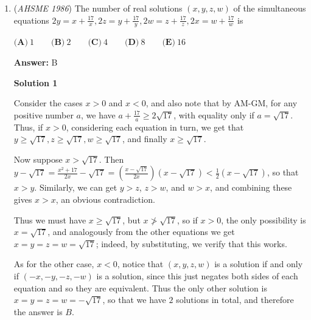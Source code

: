 \begin{enumerate}
 $\fbox{B}$




\textbf{Solution 2}

The reciprocals of the altitudes of a triangle themselves form a triangle - this can be easily proven. Let our desired altitude be $a$. 

 We have $\frac{1}{a}<\frac{1}{4}+\frac{1}{12}=\frac{1}{3}$, which implies $a>3$. We also have $\frac{1}{a}>\frac{1}{4}-\frac{1}{12}=\frac{1}{6}$, which implies $a<6$. Therefore the maximum integral value of $a$ is 5.

 $\fbox{B}$.

 


	\item (\textit{AHSME 1986}) The number of real solutions $(x,y,z,w)$ of the simultaneous equations
$2y = x + \frac{17}{x}, 2z = y + \frac{17}{y}, 2w = z + \frac{17}{z}, 2x = w + \frac{17}{w}$
is


 $\textbf{(A)}\ 1\qquad \textbf{(B)}\ 2\qquad \textbf{(C)}\ 4\qquad \textbf{(D)}\ 8\qquad \textbf{(E)}\ 16$

 \textbf{Answer: }B



\textbf{Solution 1}

Consider the cases $x>0$ and $x<0$, and also note that by AM-GM, for any positive number $a$, we have $a+\frac{17}{a} \geq 2\sqrt{17}$, with equality only if $a = \sqrt{17}$. Thus, if $x>0$, considering each equation in turn, we get that $y \geq \sqrt{17}, z \geq \sqrt{17}, w \geq \sqrt{17}$, and finally $x \geq \sqrt{17}$. 

 Now suppose $x > \sqrt{17}$. Then $y - \sqrt{17} = \frac{x^{2}+17}{2x} - \sqrt{17} = (\frac{x-\sqrt{17}}{2x})(x-\sqrt{17}) < \frac{1}{2}(x-\sqrt{17})$, so that $x > y$. Similarly, we can get $y > z$, $z > w$, and $w > x$, and combining these gives $x > x$, an obvious contradiction.

 Thus we must have $x \geq \sqrt{17}$, but $x \ngtr \sqrt{17}$, so if $x > 0$, the only possibility is $x = \sqrt{17}$, and analogously from the other equations we get $x = y = z = w = \sqrt{17}$; indeed, by substituting, we verify that this works.

 As for the other case, $x < 0$, notice that $(x,y,z,w)$ is a solution if and only if $(-x,-y,-z,-w)$ is a solution, since this just negates both sides of each equation and so they are equivalent. Thus the only other solution is $x = y = z = w = -\sqrt{17}$, so that we have $2$ solutions in total, and therefore the answer is $\boxed{B}$.


\end{enumerate}
